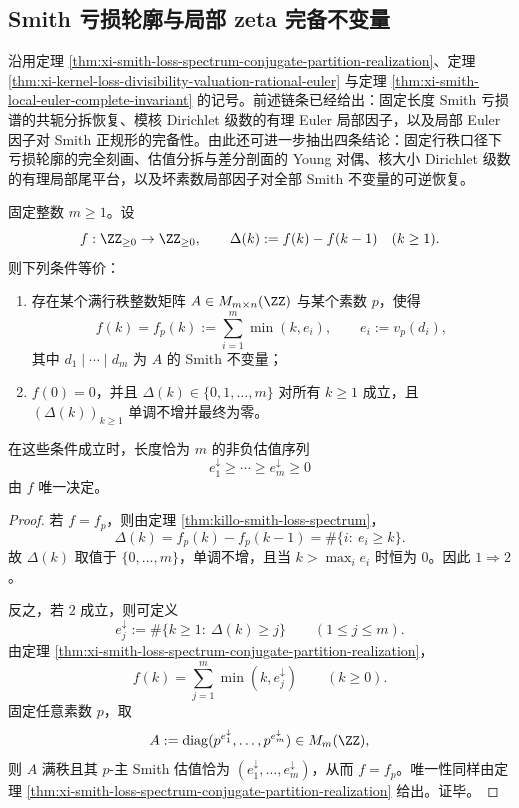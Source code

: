 \subsection{Smith 亏损轮廓与局部 zeta 完备不变量}\label{subsec:conclusion-smith-bounded-profile-local-zeta}
沿用定理 \ref{thm:xi-smith-loss-spectrum-conjugate-partition-realization}、定理 \ref{thm:xi-kernel-loss-divisibility-valuation-rational-euler} 与定理 \ref{thm:xi-smith-local-euler-complete-invariant} 的记号。前述链条已经给出：固定长度 Smith 亏损谱的共轭分拆恢复、模核 Dirichlet 级数的有理 Euler 局部因子，以及局部 Euler 因子对 Smith 正规形的完备性。由此还可进一步抽出四条结论：固定行秩口径下亏损轮廓的完全刻画、估值分拆与差分剖面的 Young 对偶、核大小 Dirichlet 级数的有理局部尾平台，以及坏素数局部因子对全部 Smith 不变量的可逆恢复。

\begin{theorem}\label{thm:conclusion-smith-bounded-rank-loss-profile-characterization}
固定整数 \(m\ge 1\)。设
\[
f:\ZZ_{\ge 0}\to \ZZ_{\ge 0},
\qquad
\Delta(k):=f(k)-f(k-1)\quad(k\ge 1).
\]
则下列条件等价：
\begin{enumerate}
  \item 存在某个满行秩整数矩阵 \(A\in M_{m\times n}(\ZZ)\) 与某个素数 \(p\)，使得
  \[
  f(k)=f_p(k):=\sum_{i=1}^{m}\min(k,e_i),
  \qquad
  e_i:=v_p(d_i),
  \]
  其中 \(d_1\mid\cdots\mid d_m\) 为 \(A\) 的 Smith 不变量；
  \item \(f(0)=0\)，并且 \(\Delta(k)\in\{0,1,\dots,m\}\) 对所有 \(k\ge 1\) 成立，且 \((\Delta(k))_{k\ge 1}\) 单调不增并最终为零。
\end{enumerate}
在这些条件成立时，长度恰为 \(m\) 的非负估值序列
\[
e_1^\downarrow\ge\cdots\ge e_m^\downarrow\ge 0
\]
由 \(f\) 唯一决定。
\end{theorem}
\begin{proof}
若 \(f=f_p\)，则由定理 \ref{thm:killo-smith-loss-spectrum}，
\[
\Delta(k)=f_p(k)-f_p(k-1)=\#\{i:\ e_i\ge k\}.
\]
故 \(\Delta(k)\) 取值于 \(\{0,\dots,m\}\)，单调不增，且当 \(k>\max_i e_i\) 时恒为 \(0\)。因此 \(1\Rightarrow 2\)。

反之，若 \(2\) 成立，则可定义
\[
e_j^\downarrow:=\#\{k\ge 1:\ \Delta(k)\ge j\}
\qquad(1\le j\le m).
\]
由定理 \ref{thm:xi-smith-loss-spectrum-conjugate-partition-realization}，
\[
f(k)=\sum_{j=1}^{m}\min(k,e_j^\downarrow)
\qquad(k\ge 0).
\]
固定任意素数 \(p\)，取
\[
A:=\operatorname{diag}(p^{e_1^\downarrow},\dots,p^{e_m^\downarrow})\in M_m(\ZZ),
\]
则 \(A\) 满秩且其 \(p\)-主 Smith 估值恰为 \((e_1^\downarrow,\dots,e_m^\downarrow)\)，从而 \(f=f_p\)。唯一性同样由定理 \ref{thm:xi-smith-loss-spectrum-conjugate-partition-realization} 给出。证毕。
\end{proof}

